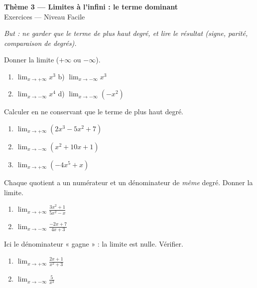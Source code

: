 \documentclass[11pt,a4paper]{article}
\begin{document}
\begin{center}
{\Large\bfseries\color{primarydark}Thème 3 — Limites à l'infini : le terme dominant}\\[2pt]
{\large\color{primary}Exercices — Niveau Facile}
\end{center}
\vspace{4pt}
{\small\itshape But : ne garder que le terme de plus haut degré, et lire le résultat (signe, parité,
comparaison de degrés).}
\vspace{6pt}

\begin{exercice}
Donner la limite ($+\infty$ ou $-\infty$).
\begin{enumerate}[label=\alph*),leftmargin=2em,itemsep=3pt]
  \item $\displaystyle\lim_{x\to+\infty} x^3$ \quad b) $\displaystyle\lim_{x\to-\infty} x^3$
  \item $\displaystyle\lim_{x\to-\infty} x^4$ \quad d) $\displaystyle\lim_{x\to-\infty} (-x^2)$
\end{enumerate}
\end{exercice}

\begin{exercice}
Calculer en ne conservant que le terme de plus haut degré.
\begin{enumerate}[label=\alph*),leftmargin=2em,itemsep=3pt]
  \item $\displaystyle\lim_{x\to+\infty}(2x^3-5x^2+7)$
  \item $\displaystyle\lim_{x\to-\infty}(x^2+10x+1)$
  \item $\displaystyle\lim_{x\to+\infty}(-4x^5+x)$
\end{enumerate}
\end{exercice}

\begin{exercice}
Chaque quotient a un numérateur et un dénominateur de \emph{même} degré. Donner la limite.
\begin{enumerate}[label=\alph*),leftmargin=2em,itemsep=3pt]
  \item $\displaystyle\lim_{x\to+\infty}\frac{3x^2+1}{5x^2-x}$
  \item $\displaystyle\lim_{x\to-\infty}\frac{-2x+7}{4x+3}$
\end{enumerate}
\end{exercice}

\begin{exercice}
Ici le dénominateur « gagne » : la limite est nulle. Vérifier.
\begin{enumerate}[label=\alph*),leftmargin=2em,itemsep=3pt]
  \item $\displaystyle\lim_{x\to+\infty}\frac{2x+1}{x^2+3}$
  \item $\displaystyle\lim_{x\to-\infty}\frac{5}{x^3}$
\end{enumerate}
\end{exercice}
\end{document}
